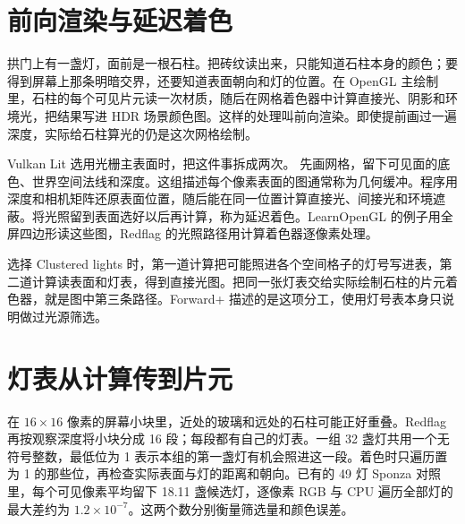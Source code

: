 \clearpage
\section{前向渲染与延迟着色}\label{sec:lighting-paths}

拱门上有一盏灯，面前是一根石柱。把砖纹读出来，只能知道石柱本身的颜色；要得到屏幕上那条明暗交界，还要知道表面朝向和灯的位置。在 OpenGL 主绘制里，石柱的每个可见片元读一次材质，随后在网格着色器中计算直接光、阴影和环境光，把结果写进 HDR 场景颜色图。这样的处理叫前向渲染。即使提前画过一遍深度，实际给石柱算光的仍是这次网格绘制。


Vulkan Lit 选用光栅主表面时，把这件事拆成两次。 先画网格，留下可见面的底色、世界空间法线和深度。这组描述每个像素表面的图通常称为几何缓冲。程序用深度和相机矩阵还原表面位置，随后能在同一位置计算直接光、间接光和环境遮蔽。将光照留到表面选好以后再计算，称为延迟着色。LearnOpenGL 的例子用全屏四边形读这些图，Redflag 的光照路径用计算着色器逐像素处理。

选择 Clustered lights 时，第一道计算把可能照进各个空间格子的灯号写进表，第二道计算读表面和灯表，得到直接光图。把同一张灯表交给实际绘制石柱的片元着色器，就是图中第三条路径。Forward+ 描述的是这项分工，使用灯号表本身只说明做过光源筛选。


\clearpage
\section{灯表从计算传到片元}

在 $16\times16$ 像素的屏幕小块里，近处的玻璃和远处的石柱可能正好重叠。Redflag 再按观察深度将小块分成 16 段；每段都有自己的灯表。一组 32 盏灯共用一个无符号整数，最低位为 1 表示本组的第一盏灯有机会照进这一段。着色时只遍历置为 1 的那些位，再检查实际表面与灯的距离和朝向。已有的 49 灯 Sponza 对照里，每个可见像素平均留下 18.11 盏候选灯，逐像素 RGB 与 CPU 遍历全部灯的最大差约为 $1.2\times10^{-7}$。这两个数分别衡量筛选量和颜色误差。

